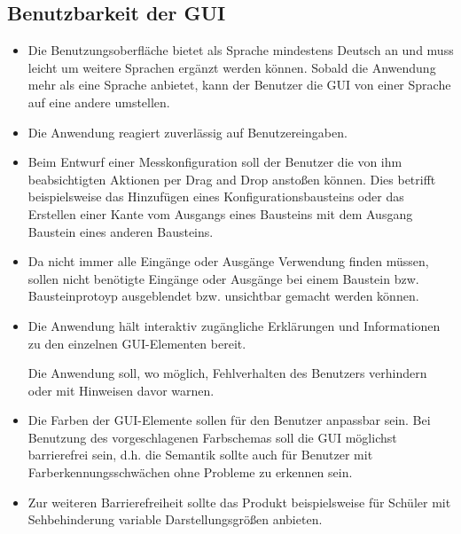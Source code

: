 \documentclass[parskip=full]{scrartcl}
\begin{document}
\subsection {Benutzbarkeit der GUI}
\begin{itemize}
	
	\item 
	\begin{WunschKrit} 		
		Die Benutzungsoberfläche bietet als Sprache mindestens Deutsch an und muss leicht um weitere Sprachen ergänzt werden können. Sobald die Anwendung mehr als eine Sprache anbietet, kann der Benutzer die GUI von einer Sprache auf eine andere umstellen.	
	\end{WunschKrit}
	\item 
	\begin{SollKrit}
		Die Anwendung reagiert zuverlässig auf Benutzereingaben.
	\end{SollKrit}
	\item 
	\begin{SollKrit} 
		Beim Entwurf einer Messkonfiguration soll der Benutzer die von ihm beabsichtigten Aktionen per Drag and Drop anstoßen können. Dies betrifft beispielsweise das Hinzufügen eines Konfigurationsbausteins oder das Erstellen einer Kante vom Ausgangs eines Bausteins mit dem Ausgang Baustein eines anderen Bausteins.
	\end{SollKrit}
	\item 
	\begin{WunschKrit}
		Da nicht immer alle Eingänge oder Ausgänge Verwendung finden müssen, sollen nicht benötigte Eingänge oder Ausgänge bei einem Baustein bzw. Bausteinprotoyp ausgeblendet bzw. unsichtbar gemacht werden können. 
	\end{WunschKrit}
	\item 
	\begin{SollKrit}
		Die Anwendung hält interaktiv zugängliche Erklärungen und Informationen zu den einzelnen GUI-Elementen bereit.
	\end{SollKrit}
	\begin{SollKrit}
		Die Anwendung soll, wo möglich, Fehlverhalten des Benutzers verhindern oder mit Hinweisen davor warnen. 
	\end{SollKrit}
	\item 
	\begin{WunschKrit} 
		Die Farben der GUI-Elemente sollen für den Benutzer anpassbar sein. Bei Benutzung des vorgeschlagenen Farbschemas soll die \gls{GUI} möglichst barrierefrei sein, d.h. die Semantik sollte auch für Benutzer mit Farberkennungsschwächen ohne Probleme zu erkennen sein.
	\end{WunschKrit} 
	
	\item 
	\begin{WunschKrit} 
		Zur weiteren Barrierefreiheit sollte das Produkt beispielsweise für Schüler mit Sehbehinderung variable Darstellungsgrößen anbieten.
	\end{WunschKrit}
	
	
\end{itemize}
\end{document}
